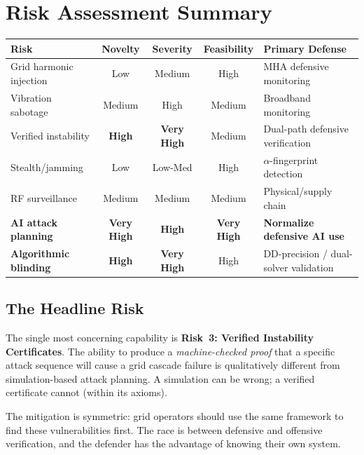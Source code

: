 \documentclass[11pt,a4paper]{article}
\begin{document}
\section{Risk Assessment Summary}

\begin{center}
\small
\begin{tabular}{@{}lcccl@{}}
\toprule
\textbf{Risk} & \textbf{Novelty} & \textbf{Severity} &
\textbf{Feasibility} & \textbf{Primary Defense} \\
\midrule
Grid harmonic injection & Low & Medium & High & MHA defensive monitoring \\
Vibration sabotage & Medium & High & Medium & Broadband monitoring \\
Verified instability & \textbf{High} & \textbf{Very High} &
  Medium & Dual-path defensive verification \\
Stealth/jamming & Low & Low-Med & High & $\alpha$-fingerprint detection \\
RF surveillance & Medium & Medium & Medium & Physical/supply chain \\
\textbf{AI attack planning} & \textbf{Very High} & \textbf{High} &
  \textbf{Very High} & \textbf{Normalize defensive AI use} \\
\textbf{Algorithmic blinding} & \textbf{High} & \textbf{Very High} &
  High & DD-precision / dual-solver validation \\
\bottomrule
\end{tabular}
\end{center}

\subsection{The Headline Risk}

The single most concerning capability is \textbf{Risk~3: Verified
Instability Certificates}. The ability to produce a
\emph{machine-checked proof} that a specific attack sequence will
cause a grid cascade failure is qualitatively different from
simulation-based attack planning. A simulation can be wrong; a
verified certificate cannot (within its axioms).

The mitigation is symmetric: grid operators should use the same
framework to find these vulnerabilities first. The race is between
defensive and offensive verification, and the defender has the
advantage of knowing their own system.
\end{document}
